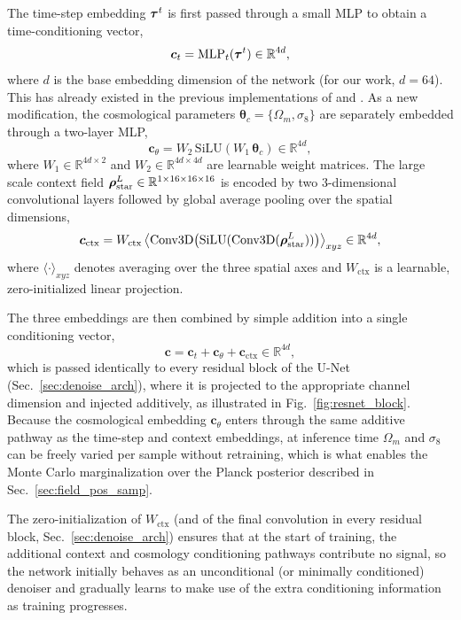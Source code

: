 The time-step embedding $\bm{\tau}^t$ is first passed through a small MLP to obtain a time-conditioning vector,
\begin{equation}
    \bm{c}_t = \mathrm{MLP}_t(\bm{\tau}^t) \in \mathbb{R}^{4d},
    \label{eq:time_cond}
\end{equation}
where $d$ is the base embedding dimension of the network (for our work, $d=64$). This has already existed in the previous implementations of \FOLD and \LODI. As a new modification, the cosmological parameters $\bm{\theta}_c = \{\Omega_m,\sigma_8\}$ are separately embedded through a two-layer MLP,
\begin{equation}
    \bm{c}_{\theta} = W_2\,\mathrm{SiLU}\!\left(W_1\,\bm{\theta}_c\right) \in \mathbb{R}^{4d},
    \label{eq:cosmo_embed}
\end{equation}
where $W_1 \in \mathbb{R}^{4d\times 2}$ and $W_2 \in \mathbb{R}^{4d\times 4d}$ are learnable weight matrices. The large scale context field $\bm{\rho}_\text{star}^L \in \mathbb{R}^{1\times16\times16\times16}$ is encoded by two 3-dimensional convolutional layers followed by global average pooling over the spatial dimensions,
\begin{equation}
    \bm{c}_{\mathrm{ctx}} = W_{\mathrm{ctx}} \left\langle \mathrm{Conv3D}\big(\mathrm{SiLU}(\mathrm{Conv3D}(\bm{\rho}_\text{star}^L))\big) \right\rangle_{xyz} \in \mathbb{R}^{4d},
    \label{eq:ctx_embed}
\end{equation}
where $\langle \cdot \rangle_{xyz}$ denotes averaging over the three spatial axes and $W_{\mathrm{ctx}}$ is a learnable, zero-initialized linear projection.

The three embeddings are then combined by simple addition into a single conditioning vector,
\begin{equation}
    \bm{c} = \bm{c}_t + \bm{c}_{\theta} + \bm{c}_{\mathrm{ctx}} \in \mathbb{R}^{4d},
    \label{eq:combined_cond}
\end{equation}
which is passed identically to every residual block of the U-Net (Sec.~\ref{sec:denoise_arch}), where it is projected to the appropriate channel dimension and injected additively, as illustrated in Fig.~\ref{fig:resnet_block}. Because the cosmological embedding $\bm{c}_\theta$ enters through the same additive pathway as the time-step and context embeddings, at inference time $\Omega_m$ and $\sigma_8$ can be freely varied per sample without retraining, which is what enables the Monte Carlo marginalization over the Planck posterior described in Sec.~\ref{sec:field_pos_samp}.

The zero-initialization of $W_{\mathrm{ctx}}$ (and of the final convolution in every residual block, Sec.~\ref{sec:denoise_arch}) ensures that at the start of training, the additional context and cosmology conditioning pathways contribute no signal, so the network initially behaves as an unconditional (or minimally conditioned) denoiser and gradually learns to make use of the extra conditioning information as training progresses.


